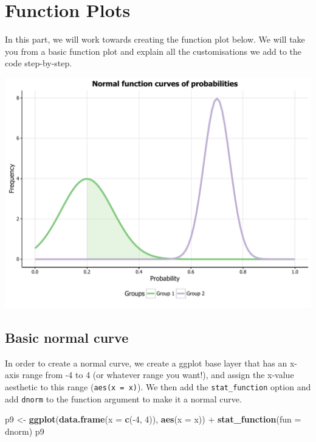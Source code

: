\documentclass[]{article}
\newenvironment{Shaded}{\begin{snugshade}}{\end{snugshade}}
\newcommand{\KeywordTok}[1]{\textcolor[rgb]{0.13,0.29,0.53}{\textbf{{#1}}}}
\newcommand{\DataTypeTok}[1]{\textcolor[rgb]{0.13,0.29,0.53}{{#1}}}
\newcommand{\DecValTok}[1]{\textcolor[rgb]{0.00,0.00,0.81}{{#1}}}
\newcommand{\StringTok}[1]{\textcolor[rgb]{0.31,0.60,0.02}{{#1}}}
\newcommand{\NormalTok}[1]{{#1}}
\begin{document}
\section{Function Plots}\label{function-plots}

In this part, we will work towards creating the function plot below. We
will take you from a basic function plot and explain all the
customisations we add to the code step-by-step.

\begin{center}\includegraphics{0_all_posts_pdf/function_final-1} \end{center}

\subsection{Basic normal curve}\label{basic-normal-curve}

In order to create a normal curve, we create a ggplot base layer that
has an x-axis range from -4 to 4 (or whatever range you want!), and
assign the x-value aesthetic to this range (\texttt{aes(x\ =\ x)}). We
then add the \texttt{stat\_function} option and add \texttt{dnorm} to
the function argument to make it a normal curve.

\begin{Shaded}
\begin{Highlighting}[]
\NormalTok{p9 <-}\StringTok{ }\KeywordTok{ggplot}\NormalTok{(}\KeywordTok{data.frame}\NormalTok{(}\DataTypeTok{x =} \KeywordTok{c}\NormalTok{(-}\DecValTok{4}\NormalTok{, }\DecValTok{4}\NormalTok{)), }\KeywordTok{aes}\NormalTok{(}\DataTypeTok{x =} \NormalTok{x)) +}
\StringTok{      }\KeywordTok{stat_function}\NormalTok{(}\DataTypeTok{fun =} \NormalTok{dnorm)}
\NormalTok{p9}
\end{Highlighting}
\end{Shaded}
\end{document}
